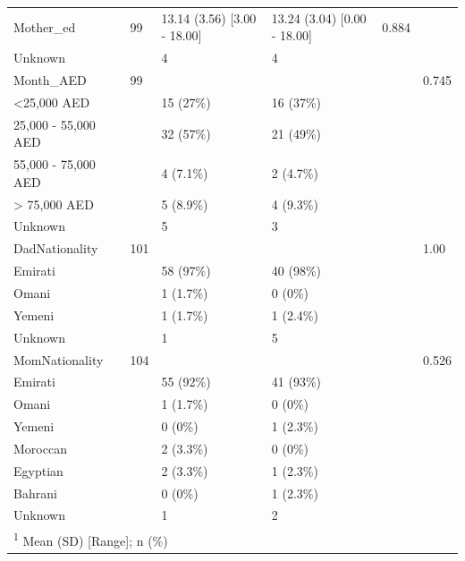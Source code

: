 \documentclass[
]{article}
\begin{document}
\begin{table}[!h]
\begin{tabular}[t]{llllll}
Mother\_ed & 99 & 13.14 (3.56)   [3.00 - 18.00] & 13.24 (3.04)   [0.00 - 18.00] & 0.884 & \\
\hspace{1em}Unknown &  & 4 & 4 &  & \\
Month\_AED & 99 &  &  &  & 0.745\\
\addlinespace
\hspace{1em}<25,000 AED &  & 15 (27\%) & 16 (37\%) &  & \\
\hspace{1em}25,000 - 55,000 AED &  & 32 (57\%) & 21 (49\%) &  & \\
\hspace{1em}55,000 - 75,000 AED &  & 4 (7.1\%) & 2 (4.7\%) &  & \\
\hspace{1em}> 75,000 AED &  & 5 (8.9\%) & 4 (9.3\%) &  & \\
\hspace{1em}Unknown &  & 5 & 3 &  & \\
\addlinespace
DadNationality & 101 &  &  &  & 1.00\\
\hspace{1em}Emirati &  & 58 (97\%) & 40 (98\%) &  & \\
\hspace{1em}Omani &  & 1 (1.7\%) & 0 (0\%) &  \vphantom{1} & \\
\hspace{1em}Yemeni &  & 1 (1.7\%) & 1 (2.4\%) &  & \\
\hspace{1em}Unknown &  & 1 & 5 &  & \\
\addlinespace
MomNationality & 104 &  &  &  & 0.526\\
\hspace{1em}Emirati &  & 55 (92\%) & 41 (93\%) &  & \\
\hspace{1em}Omani &  & 1 (1.7\%) & 0 (0\%) &  & \\
\hspace{1em}Yemeni &  & 0 (0\%) & 1 (2.3\%) &  & \\
\hspace{1em}Moroccan &  & 2 (3.3\%) & 0 (0\%) &  & \\
\addlinespace
\hspace{1em}Egyptian &  & 2 (3.3\%) & 1 (2.3\%) &  & \\
\hspace{1em}Bahrani &  & 0 (0\%) & 1 (2.3\%) &  & \\
\hspace{1em}Unknown &  & 1 & 2 &  & \\
\bottomrule
\multicolumn{6}{l}{\rule{0pt}{1em}\textsuperscript{1} Mean (SD)   [Range]; n (\%)}\\
\end{tabular}
\end{table}
\end{document}
